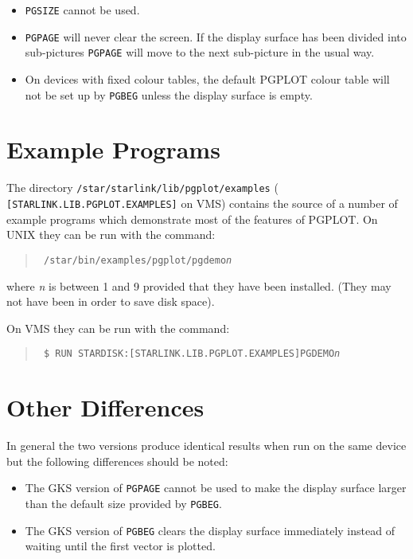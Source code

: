 \begin{itemize}
\item {\tt PGSIZE} cannot be used.

\item {\tt PGPAGE} will never clear the screen. If the display surface has
been divided into sub-pictures {\tt PGPAGE} will move to the next sub-picture
in the usual way.

\item On devices with fixed colour tables, the default PGPLOT colour table
will not be set up by {\tt PGBEG} unless the display surface is empty.

\end{itemize}

\section{Example Programs}

The directory {\tt /star/starlink/lib/pgplot/examples} ({\tt 
[STARLINK.LIB.PGPLOT.EXAMPLES]} on VMS) contains the source of a number 
of example programs which demonstrate most of the features of PGPLOT. 
On UNIX they can be run with the command:
\begin{quote}\tt
/star/bin/examples/pgplot/pgdemo{\em n}
\end{quote}
where {\em n} is between 1 and 9 provided that they have been installed.
(They may not have been in order to save disk space).

On VMS they can be run
with the command:
\begin{quote}\tt
\$ RUN STARDISK:[STARLINK.LIB.PGPLOT.EXAMPLES]PGDEMO{\em n}
\end{quote}

\section{Other Differences}
In general the two versions produce identical results when run on the same
device but the following differences should be noted:
\begin{itemize}
\item The GKS version of {\tt PGPAGE} cannot be used to make the display surface
larger than the default size provided by {\tt PGBEG}.
\item The GKS version of {\tt PGBEG} clears the display surface immediately
instead of waiting until the first vector is plotted.
\end{itemize}


